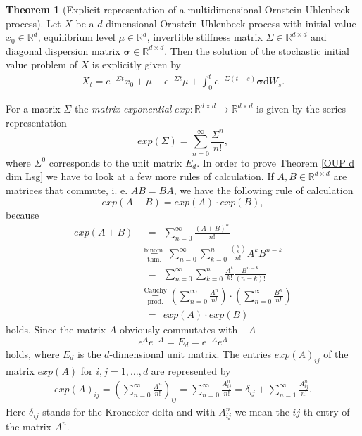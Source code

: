 \documentclass[11pt,titlepage]{article}
\newcommand{\R}{\mathbb{R}} %
\theoremstyle{definition}
\newtheorem{theorem}{Theorem}[section]
\theoremstyle{remark}
\begin{document}
	\begin{theorem}[Explicit representation of a multidimensional Ornstein-Uhlenbeck process]\label{Thm expl repr d dim OUP} \label{OUP d dim Lsg}
		Let $X$ be a $d$-dimensional Ornstein-Uhlenbeck process with initial value $x_0\in\R^d$,  equilibrium level $\mu\in\R^d$, invertible stiffness matrix $\Sigma\in\R^{d\times d}$ 
		and diagonal dispersion matrix $\boldsymbol{\sigma}\in\R^{d\times d}$. Then the solution of the stochastic initial value problem of $X$ is explicitly given by
		\begin{align} \label{multidim expl repr OUP}
			X_t = e^{-\Sigma t}x_0+\mu-e^{-\Sigma t}\mu+\int_0^t e^{-\Sigma(t-s)}\boldsymbol{\sigma}\mathrm{d}W_s.
		\end{align}
	\end{theorem}
	\noindent
	For a matrix $\Sigma$ the \textsl{matrix exponential} $exp:\R^{d\times d}\to \R^{d\times d}$ is given by the series representation 
	\[exp(\Sigma)= \sum_{n=0}^{\infty} \frac{\Sigma^n}{n!},\]
	where $\Sigma^0$ corresponds to the unit matrix $E_d$. In order to prove 
	Theorem \ref{OUP d dim Lsg} we have to look at a few more rules of calculation. 
	If $A,B\in\R^{d\times d}$ are matrices that commute, i. e. $AB = BA$, we have the following rule of calculation 
	\[exp(A+B)=exp(A)\cdot exp(B),\]
	because
	\begin{align*}
		exp(A+B)&\ \ =\ \ \sum_{n=0}^{\infty} \frac{(A+B)^n}{n!}\\
		&\overset{\text{binom.}}{\underset{\text{thm.}}{=}}
		\sum_{n=0}^{\infty}\sum_{k=0}^n \frac{\binom{n}{k}}{n!}A^k B^{n-k}\\
		&\ \ =\ \ \sum_{n=0}^{\infty}\sum_{k=0}^n \frac{A^k}{k!}\frac{B^{n-k}}{(n-k)!}\\
		&\overset{\text{Cauchy}}{\underset{\text{prod.}}{=}}
		\left(\sum_{n=0}^{\infty}\frac{A^n}{n!}\right)\cdot \left(\sum_{n=0}^{\infty}\frac{B^n}{n!}\right)\\
		&\ \ =\ \ exp(A)\cdot exp(B)
	\end{align*}
	holds. Since the matrix $A$ obviously commutates with $-A$
	\[e^{A}e^{-A}= E_d = e^{-A}e^{A}\]
	holds, where $E_d$ is the $d$-dimensional unit matrix.
	The entries $exp(A)_{ij}$ of the matrix $exp(A)$ for $i,j=1,\ldots,d$ are represented by
	\begin{align}
		exp(A)_{ij}=\left(\sum_{n=0}^{\infty}\frac{A^n}{n!}\right)_{ij}
		=\sum_{n=0}^{\infty}\frac{A^n_{ij}}{n!}
		=\delta_{ij}+\sum_{n=1}^{\infty}\frac{A^n_{ij}}{n!}.\label{Eintr_exp_mat}
	\end{align}
	Here $\delta_{ij}$ stands for the Kronecker delta and with $A^n_{ij}$ we mean the $ij$-th entry of the matrix $A^n$.
	
\end{document}
